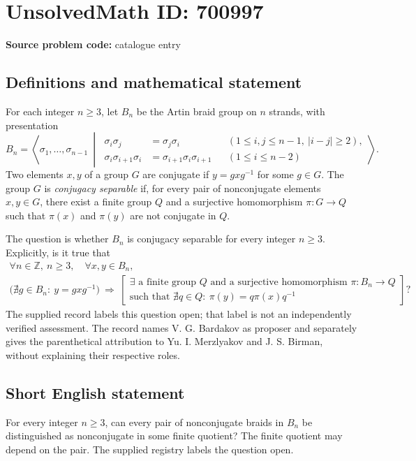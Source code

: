 \documentclass[11pt]{article}
\newcommand{\Z}{\mathbb{Z}}
\begin{document}
\section*{UnsolvedMath ID: 700997}
\textbf{Source problem code:} catalogue entry
\subsection{Definitions and mathematical statement}
For each integer \(n\geq 3\), let \(B_n\) be the Artin braid group on \(n\) strands, with presentation
\[
B_n=\left\langle \sigma_1,\ldots,\sigma_{n-1}\ \middle|\ 
\begin{aligned}
\sigma_i\sigma_j&=\sigma_j\sigma_i &&(1\leq i,j\leq n-1,\ |i-j|\geq 2),\\
\sigma_i\sigma_{i+1}\sigma_i&=\sigma_{i+1}\sigma_i\sigma_{i+1} &&(1\leq i\leq n-2)
\end{aligned}
\right\rangle.
\]
Two elements \(x,y\) of a group \(G\) are conjugate if \(y=gxg^{-1}\) for some \(g\in G\). The group \(G\) is \emph{conjugacy separable} if, for every pair of nonconjugate elements \(x,y\in G\), there exist a finite group \(Q\) and a surjective homomorphism \(\pi:G\to Q\) such that \(\pi(x)\) and \(\pi(y)\) are not conjugate in \(Q\).

The question is whether \(B_n\) is conjugacy separable for every integer \(n\geq 3\). Explicitly, is it true that
\[
\begin{gathered}
\forall n\in\Z,\ n\geq 3,\quad \forall x,y\in B_n,\\
\bigl(\nexists g\in B_n:\ y=gxg^{-1}\bigr)
\ \Longrightarrow\ 
\left[\begin{gathered}
\exists\text{ a finite group }Q\text{ and a surjective homomorphism }\pi:B_n\to Q\\
\text{such that }\nexists q\in Q:\ \pi(y)=q\pi(x)q^{-1}
\end{gathered}\right]?
\end{gathered}
\]
The supplied record labels this question open; that label is not an independently verified assessment. The record names V. G. Bardakov as proposer and separately gives the parenthetical attribution to Yu. I. Merzlyakov and J. S. Birman, without explaining their respective roles.
\subsection{Short English statement}
For every integer \(n\geq 3\), can every pair of nonconjugate braids in \(B_n\) be distinguished as nonconjugate in some finite quotient? The finite quotient may depend on the pair. The supplied registry labels the question open.
\end{document}
